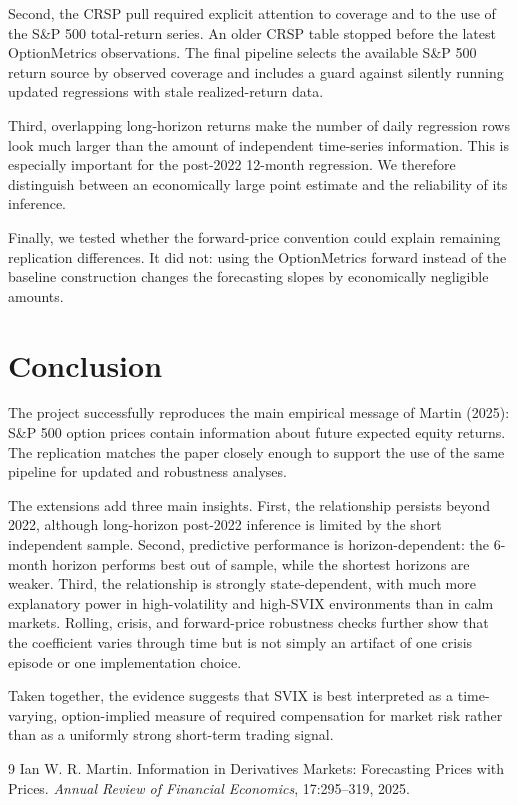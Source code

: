 \documentclass[11pt]{article}
\begin{document}
Second, the CRSP pull required explicit attention to coverage and to the use of the S\&P 500 total-return series. An older CRSP table stopped before the latest OptionMetrics observations. The final pipeline selects the available S\&P 500 return source by observed coverage and includes a guard against silently running updated regressions with stale realized-return data.

Third, overlapping long-horizon returns make the number of daily regression rows look much larger than the amount of independent time-series information. This is especially important for the post-2022 12-month regression. We therefore distinguish between an economically large point estimate and the reliability of its inference.

Finally, we tested whether the forward-price convention could explain remaining replication differences. It did not: using the OptionMetrics forward instead of the baseline construction changes the forecasting slopes by economically negligible amounts.

\section{Conclusion}

The project successfully reproduces the main empirical message of Martin (2025): S\&P 500 option prices contain information about future expected equity returns. The replication matches the paper closely enough to support the use of the same pipeline for updated and robustness analyses.

The extensions add three main insights. First, the relationship persists beyond 2022, although long-horizon post-2022 inference is limited by the short independent sample. Second, predictive performance is horizon-dependent: the 6-month horizon performs best out of sample, while the shortest horizons are weaker. Third, the relationship is strongly state-dependent, with much more explanatory power in high-volatility and high-SVIX environments than in calm markets. Rolling, crisis, and forward-price robustness checks further show that the coefficient varies through time but is not simply an artifact of one crisis episode or one implementation choice.

Taken together, the evidence suggests that SVIX is best interpreted as a time-varying, option-implied measure of required compensation for market risk rather than as a uniformly strong short-term trading signal.

\begin{thebibliography}{9}
Ian W. R. Martin.
\newblock Information in Derivatives Markets: Forecasting Prices with Prices.
\newblock \textit{Annual Review of Financial Economics}, 17:295--319, 2025.
\end{thebibliography}
\end{document}
